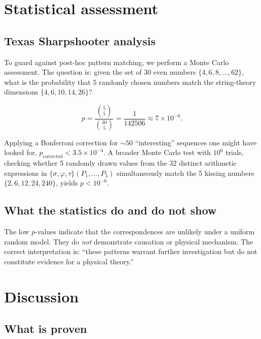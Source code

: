 \documentclass[11pt,letterpaper]{article}
\theoremstyle{definition}
\theoremstyle{remark}
\begin{document}
\section{Statistical assessment}
\label{sec:stats}

\subsection{Texas Sharpshooter analysis}

To guard against post-hoc pattern matching, we perform a Monte Carlo 
assessment. The question is: given the set of 30 even numbers 
$\{4, 6, 8, \ldots, 62\}$, what is the probability that 5 randomly 
chosen numbers match the string-theory dimensions $\{4, 6, 10, 14, 26\}$?

\begin{equation}
p = \frac{\binom{5}{5}}{\binom{30}{5}} = \frac{1}{142506} \approx 7 \times 10^{-6}.
\end{equation}

Applying a Bonferroni correction for $\sim 50$ ``interesting'' sequences 
one might have looked for, $p_{\text{corrected}} < 3.5 \times 10^{-4}$.
A broader Monte Carlo test with $10^6$ trials, checking whether 5 randomly 
drawn values from the 32 distinct arithmetic expressions in 
$\{\sigma, \varphi, \tau\}(P_1, \ldots, P_5)$ simultaneously match 
the 5 kissing numbers $\{2, 6, 12, 24, 240\}$, yields $p < 10^{-6}$.

\subsection{What the statistics do and do not show}

The low $p$-values indicate that the correspondences are unlikely under 
a uniform random model. They do \emph{not} demonstrate causation or 
physical mechanism. The correct interpretation is: ``these patterns 
warrant further investigation but do not constitute evidence for a 
physical theory.''

\section{Discussion}
\label{sec:discussion}

\subsection{What is proven}
\end{document}
